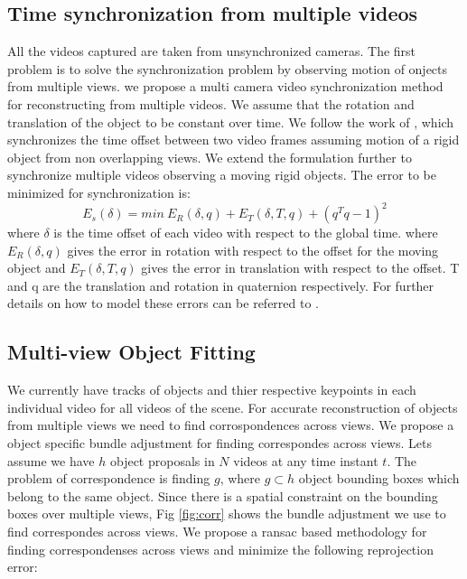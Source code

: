 \documentclass[10pt,twocolumn,letterpaper]{article}
\begin{document}
\subsection{Time synchronization from multiple videos}
All the videos captured are taken from unsynchronized cameras. The first problem is to solve the synchronization problem by observing motion of onjects from multiple views. we propose a multi camera video synchronization method for reconstructing from multiple videos. We assume that the rotation and translation of the object to be constant over time. We follow the work of \cite{gaspar2014synchronization}, which synchronizes the time offset between two video frames assuming motion of a rigid object from non overlapping views. We extend the formulation further to synchronize multiple videos observing a moving rigid objects. The error to be minimized for synchronization is:
\begin{equation}
  	E_s(\delta) = min \ E_{R}(\delta,q) + E_{T}(\delta,T,q) + (q^{T} q -1)^2
\end{equation}
where $\delta$ is the time offset of each video with respect to the global time. where $E_R(\delta,q)$ gives the error in rotation with respect to the offset for the moving object and $E_T(\delta,T,q)$ gives the error in translation with respect to the offset. T and q are the translation and rotation in quaternion respectively. For further details on how to model these errors can be referred to \cite{gaspar2014synchronization}.


\subsection{Multi-view Object Fitting}
We currently have tracks of objects and thier respective keypoints in each individual video for all videos of the scene. For accurate reconstruction of objects from multiple views we need to find corrospondences across views. We propose a object specific bundle adjustment for finding correspondes across views. Lets assume we have $h$ object proposals in $N$ videos at any time instant $t$. The problem of correspondence is finding $g$, where $g \subset h$ object bounding boxes which belong to the same object. Since there is a spatial constraint on the bounding boxes over multiple views, Fig \ref{fig:corr} shows the bundle adjustment we use to find correspondes across views. We propose a ransac based methodology for finding correspondenses across views and minimize the following reprojection error:
\end{document}

